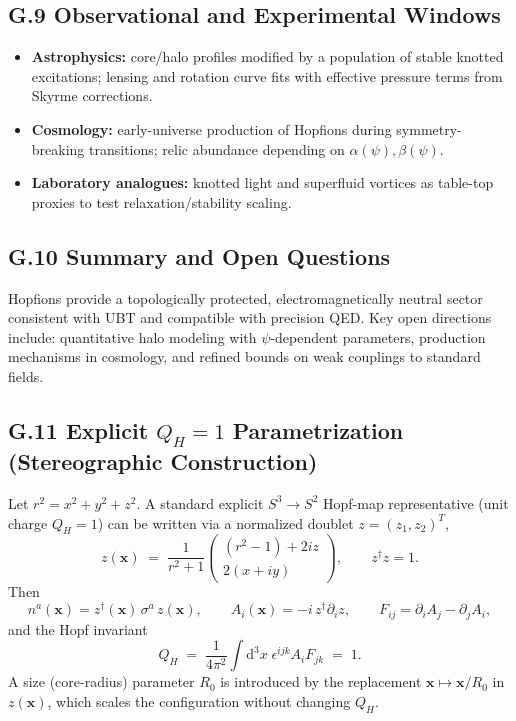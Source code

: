 \documentclass[12pt,a4paper]{article}
\begin{document}
\subsection*{G.9 Observational and Experimental Windows}
\begin{itemize}
\item \textbf{Astrophysics:} core/halo profiles modified by a population of stable knotted excitations; lensing and rotation curve fits with effective pressure terms from Skyrme corrections.
\item \textbf{Cosmology:} early-universe production of Hopfions during symmetry-breaking transitions; relic abundance depending on $\alpha(\psi),\beta(\psi)$.
\item \textbf{Laboratory analogues:} knotted light and superfluid vortices as table-top proxies to test relaxation/stability scaling.
\end{itemize}

\subsection*{G.10 Summary and Open Questions}
Hopfions provide a topologically protected, electromagnetically neutral sector consistent with UBT and compatible with precision QED. 
Key open directions include: quantitative halo modeling with $\psi$-dependent parameters, production mechanisms in cosmology, and refined bounds on weak couplings to standard fields.

\subsection*{G.11 Explicit $Q_H=1$ Parametrization (Stereographic Construction)}
Let $r^2=x^2+y^2+z^2$. A standard explicit $S^3\!\to\!S^2$ Hopf-map representative (unit charge $Q_H=1$) can be written via a normalized doublet $z=(z_1,z_2)^T$,
\begin{equation}
z(\mathbf{x}) \;=\; \frac{1}{r^2+1}\begin{pmatrix}
(r^2-1) + 2 i z \\[4pt]
2(x+i y)
\end{pmatrix},\qquad z^\dagger z = 1.
\end{equation}
Then
\begin{equation}
n^a(\mathbf{x}) = z^\dagger(\mathbf{x})\,\sigma^a\, z(\mathbf{x}),\qquad
A_i(\mathbf{x})=-i\, z^\dagger \partial_i z,\qquad F_{ij}=\partial_i A_j-\partial_j A_i,
\end{equation}
and the Hopf invariant
\begin{equation}
Q_H \;=\; \frac{1}{4\pi^2}\int\!\mathrm{d}^3x\;\epsilon^{ijk} A_i F_{jk} \;=\; 1.
\end{equation}
A size (core-radius) parameter $R_0$ is introduced by the replacement $\mathbf{x}\mapsto \mathbf{x}/R_0$ in $z(\mathbf{x})$, which scales the configuration without changing $Q_H$.
\end{document}
